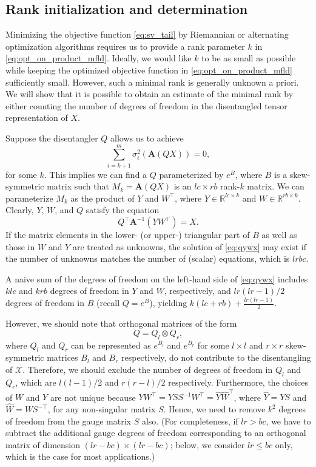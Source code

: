 \documentclass[pdflatex,sn-mathphys-num]{sn-jnl}
\newcounter{thm}[section]
\begin{document}
\subsection{Rank initialization and determination}
\label{sec:rank}
Minimizing the objective function \eqref{eq:sv_tail} by Riemannian or alternating optimization algorithms requires us to provide a rank parameter $k$ in \eqref{eq:opt_on_product_mfld}. Ideally, we would like $k$ to be as small as possible while keeping the optimized objective function in \eqref{eq:opt_on_product_mfld} sufficiently small. However, such a minimal rank is generally unknown a priori. We will show that it is possible to obtain an estimate of the minimal rank by either counting the
number of degrees of freedom in the disentangled tensor representation of $X$.

Suppose the disentangler $Q$ allows us to achieve 
\begin{equation}
\sum_{i=k+1}^m \sigma_i^2(\mathbf{A}(QX)) = 0,
\label{eq:exactrank}
\end{equation}
for some $k$. This implies we can find a $Q$ parameterized by $e^{B}$, where $B$ is a skew-symmetric matrix such that $M_k = \mathbf{A}(QX)$ is an $lc\times rb$ rank-$k$ matrix.  We can parameterize $M_k$ as the product of $Y$ and $W^{\top}$, where $Y \in \mathbb{R}^{lc\times k}$ and $W \in \mathbb{R}^{rb \times k}$.  Clearly, $Y$, $W$, and $Q$ satisfy the equation
\begin{equation}
Q^{\top}\mathbf{A}^{-1}(YW^{\top}) = X. \label{eq:qywx}
\end{equation}
If the matrix elements in the lower- (or upper-) triangular part of $B$ as well as those in $W$ and $Y$ are treated as unknowns, the solution of \eqref{eq:qywx} may exist if the number of unknowns matches the number of (scalar) equations, which is $lrbc$.

A naive sum of the degrees of freedom on the left-hand side of \eqref{eq:qywx} includes $klc$ and $krb$ degrees of freedom in $Y$ and $W$, respectively, and $lr(lr-1)/2$ degrees of freedom in $B$ (recall $Q = e^{B}$), yielding $k(lc + rb) + \frac{lr(lr-1)}{2}$.   

However, we should note that orthogonal matrices of the form 
\[
Q = Q_l \otimes Q_r, 
\]
where $Q_l$ and $Q_r$ can be represented as 
$e^{B_l}$ and $e^{B_r}$ for some $l\times l$ and $r \times r$ skew-symmetric matrices $B_l$ and $B_r$ respectively, do not contribute to the disentangling of $\mathcal{X}$. Therefore, we should exclude the number of degrees of freedom in $Q_l$ and $Q_r$, which are $l(l-1)/2$ and $r(r-l)/2$ respectively. Furthermore, the choices of $W$ and $Y$ are not unique because $YW^{\top} = YSS^{-1}W^{\top} = \hat{Y} \hat{W}^{\top}$, where $\hat{Y}=YS$ and $\hat{W} = WS^{-{\top}}$, for any non-singular matrix $S$. Hence, we need to remove $k^2$ degrees of freedom from the gauge matrix $S$ also. (For completeness, if $lr > bc$, we have to subtract the additional gauge degrees of freedom corresponding to an orthogonal matrix of dimension $(lr - bc) \times (lr - bc)$; below, we consider $lr \leq bc$ only, which is the case for most applications.)
\end{document}
